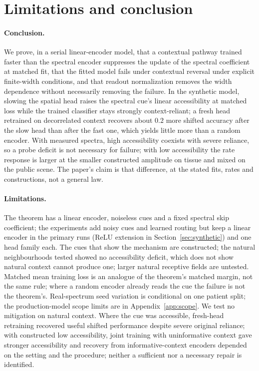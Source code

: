 \section{Limitations and conclusion}
\label{sec:limitations}

\paragraph{Conclusion.}
We prove, in a serial linear-encoder model, that a contextual pathway
trained faster than the spectral encoder suppresses the update of the
spectral coefficient at matched fit, that the fitted model fails under contextual reversal
under explicit finite-width conditions, and that readout normalization
removes the width dependence without necessarily removing the failure.
In the synthetic model, slowing the spatial head raises the spectral
cue's linear accessibility at matched loss while the trained classifier
stays strongly context-reliant; a fresh head retrained on decorrelated
context recovers about $0.2$ more shifted accuracy after the slow head
than after the fast one, which yields little more than a random encoder. With measured spectra, high accessibility
coexists with severe reliance, so a probe deficit is not necessary for
failure; with low accessibility the rate response is larger at the
smaller constructed amplitude on tissue and mixed on the public scene. The
paper's claim is that difference, at the stated fits, rates and
constructions, not a general law.

\paragraph{Limitations.}
The theorem has a linear encoder, noiseless cues and a fixed spectral skip
coefficient; the experiments add noisy cues and learned routing but keep
a linear encoder in the primary runs (ReLU extension in
Section~\ref{sec:synthetic}) and one head family each. The cues that
show the mechanism are constructed; the natural neighbourhoods tested
showed no accessibility deficit, which does not show natural context
cannot produce one; larger natural receptive fields are untested.
Matched mean training loss is an analogue
of the theorem's matched margin, not the same rule; where a random
encoder already reads the cue the failure is not the theorem's.
Real-spectrum seed variation is conditional on one patient split; the
production-model scope limits are in Appendix~\ref{app:scope}. We test no
mitigation on natural context.
Where the cue was accessible, fresh-head retraining recovered useful
shifted performance despite severe original reliance; with constructed
low accessibility, joint training with uninformative context gave
stronger accessibility and recovery from informative-context encoders
depended on the setting and the procedure; neither a sufficient nor a
necessary repair is identified.
